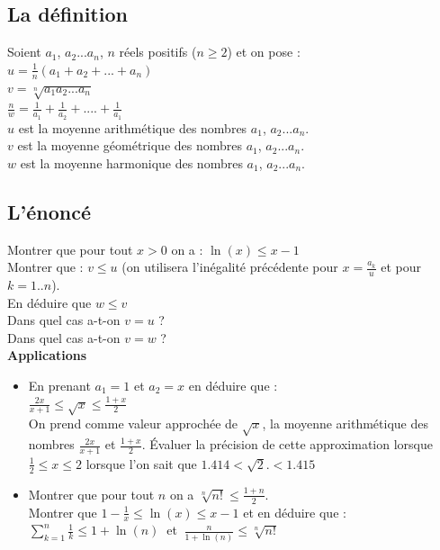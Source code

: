 \documentclass[a4paper,11pt]{book}
\begin{document}
\subsection{La d\'efinition}
Soient $a_1$, $a_2$...$a_n$, $n$ r\'eels positifs ($n\geq 2$) et on pose :\\
$\displaystyle u=\frac{1}{n}(a_1+a_2+...+a_n)$\\
$v=\sqrt[n]{a_1a_2...a_n}$\\
$\displaystyle \frac{n}{w}=\frac{1}{a_1}+\frac{1}{a_2}+....+\frac{1}{a_1}$\\
$u$ est la moyenne arithm\'etique des nombres $a_1$, $a_2$...$a_n$.\\
$v$ est la moyenne g\'eom\'etrique des nombres $a_1$, $a_2$...$a_n$.\\
$w$ est la moyenne harmonique des nombres $a_1$, $a_2$...$a_n$.
\subsection{L'\'enonc\'e}
Montrer que pour tout $x>0$ on a : $\ln(x) \leq x-1$\\
Montrer que : $v\leq u$ (on utilisera l'in\'egalit\'e pr\'ec\'edente pour
$\displaystyle x=\frac{a_k}{u}$ et pour $k=1..n$).\\ 
En d\'eduire que $w\leq v$\\
Dans quel cas a-t-on $v=u$ ?\\
Dans quel cas a-t-on $v=w$ ?\\
{\bf Applications}
\begin{itemize}
\item
En prenant $a_1=1$ et $a_2=x$ en d\'eduire que :\\
$\displaystyle\frac{2x}{x+1} \leq \sqrt x \leq \frac{1+x}{2}$\\
On prend comme valeur approch\'ee de $\sqrt x $, la moyenne arithm\'etique
des nombres $\displaystyle\frac{2x}{x+1}$ et $\displaystyle\frac{1+x}{2}$. 
\'Evaluer la pr\'ecision de cette approximation lorsque 
$\displaystyle\frac{1}{2}\leq x\leq 2$ lorsque l'on sait que
$1.414<\sqrt 2.<1.415$\\
\item Montrer que pour tout $n$ on a
$ \displaystyle\sqrt[n]{n!}\leq \frac{1+n}{2}$.\\
Montrer que 
$\displaystyle 1-\frac{1}{x}\leq \ln(x)\leq x-1$ et en d\'eduire que :\\
$\displaystyle\sum_{k=1}^n\frac{1}{k}\leq 1+\ln(n)\ $ et 
$\ \displaystyle\frac{n}{1+\ln(n)}\leq \sqrt[n]{n!}$
\end{itemize}
\end{document}
